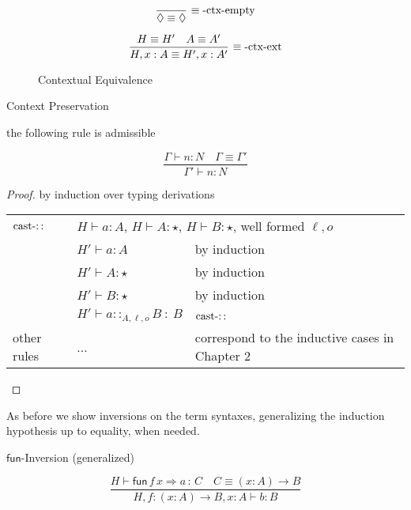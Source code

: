 \begin{figure}
\[
\frac{\ }{\lozenge\equiv\lozenge}\,\rulename{\ensuremath{\equiv}-ctx-empty}
\]

\[
\frac{H\equiv H'\quad A\equiv A'}{H,x:A\equiv H',x:A'}\,\operatorname{\equiv-ctx-ext}
\]

\caption{Contextual Equivalence}
\label{fig:surface-Context-Equiv}
\end{figure}

\begin{lem}
Context Preservation

the following rule is admissible

\[
\frac{\Gamma\vdash n:N\quad\Gamma\equiv\Gamma'}{\Gamma'\vdash n:N}
\]
\end{lem}

\begin{proof}
by induction over typing derivations

\begin{tabular}{lll}
$\operatorname{cast-::}$ & \multicolumn{2}{l}{$H\vdash a:A$, $H\vdash A:\star$, $H\vdash B:\star$, well formed $\ensuremath{\ell},o$}\tabularnewline
 & $H'\vdash a:A$ & by induction\tabularnewline
 & $H'\vdash A:\star$ & by induction\tabularnewline
 & $H'\vdash B:\star$ & by induction\tabularnewline
 & $H'\vdash a::_{A,\ensuremath{\ell},o}B\::\:B$ & $\operatorname{cast-::}$\tabularnewline
other rules & ... & correspond to the inductive cases in Chapter 2\tabularnewline
\end{tabular}
\end{proof}
As before we show inversions on the term syntaxes, generalizing the induction hypothesis up to equality, when needed.
\begin{lem}
$\mathsf{fun}$-Inversion (generalized)

\[
\frac{H\vdash\mathsf{fun}\,f\,x\Rightarrow a\,:\,C\quad C\equiv\left(x:A\right)\rightarrow B}{H,f:\left(x:A\right)\rightarrow B,x:A\vdash b:B}
\]
\end{lem}

